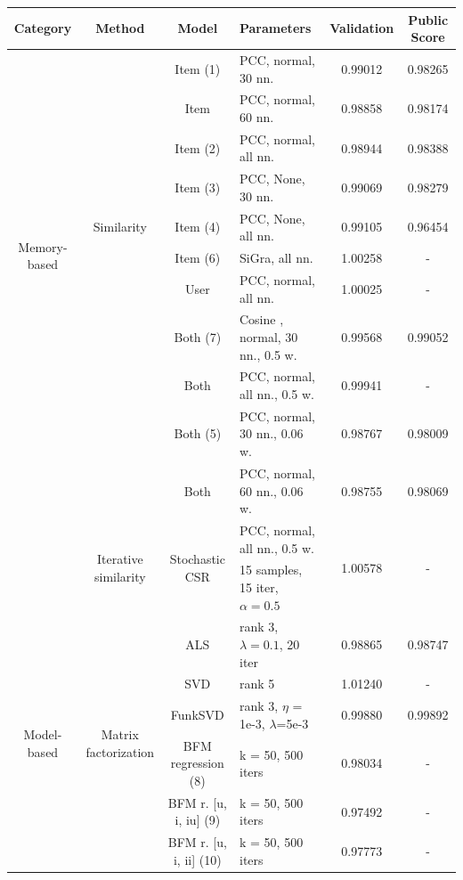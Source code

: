 \documentclass[sigconf]{acmart}
\begin{document}
\onecolumn
\vspace*{\fill}
\renewcommand{\arraystretch}{1.2}
\begin{table}[h]
    \centering
  \begin{tabular}{|c | c | c | l |  c  c|}
    \hline
    \textbf{Category} & \textbf{Method} & \textbf{Model} & \textbf{Parameters} & \textbf{Validation} & \textbf{Public Score} \\
    \hline
    \multirow{10}{*}{Memory-based}  & \multirow{9}{*}{Similarity} & Item (1) & PCC, normal, 30 nn. & 0.99012 & 0.98265\\
    &&Item & PCC, normal, 60 nn. &  0.98858 & 0.98174\\ 
    &&Item (2)& PCC, normal, all nn. & 0.98944 & 0.98388\\
    &&Item (3)& PCC, None, 30 nn. & 0.99069 & 0.98279\\
    &&Item (4)& PCC, None, all nn. & 0.99105 & 0.96454\\
    &&Item (6) & SiGra, all nn. & 1.00258 & -\\
    &&User & PCC, normal, all nn. & 1.00025 & -\\
    &&Both (7) & Cosine , normal, 30 nn., 0.5 w. & 0.99568 & 0.99052\\
    &&Both & PCC, normal, all nn., 0.5 w. & 0.99941 & - \\
    &&Both (5) & PCC, normal, 30 nn., 0.06 w. & 0.98767 & 0.98009\\
    &&Both & PCC, normal, 60 nn., 0.06 w. & 0.98755 & 0.98069\\
    \cline{2-6}
    &\multirow{2}{*}{Iterative similarity}  &  \multirow{2}{*}{Stochastic CSR} & PCC, normal, all nn., 0.5 w. & \multirow{2}{*}{1.00578}&\multirow{2}{*}{-}\\
    &&& 15 samples, 15 iter, $\alpha=0.5$ && \\
    \hline
    \multirow{22}{*}{Model-based}  & \multirow{10}{*}{Matrix factorization} & ALS & rank 3, $\lambda=0.1$, 20 iter  & 0.98865 & 0.98747 \\
    && SVD & rank 5 & 1.01240 & -  \\
    && FunkSVD & rank 3, $\eta$ = 1e-3, $\lambda$=5e-3 & 0.99880 & 0.99892 \\
    \cline{3-6}
    && BFM regression (8)& k = 50, 500 iters & 0.98034 & - \\
    && BFM r. [u, i, iu] (9)& k = 50, 500 iters & 0.97492 & - \\
    && BFM r. [u, i, ii] (10) & k = 50, 500 iters & 0.97773 & - \\

\end{tabular}
\end{table}
\end{document}

